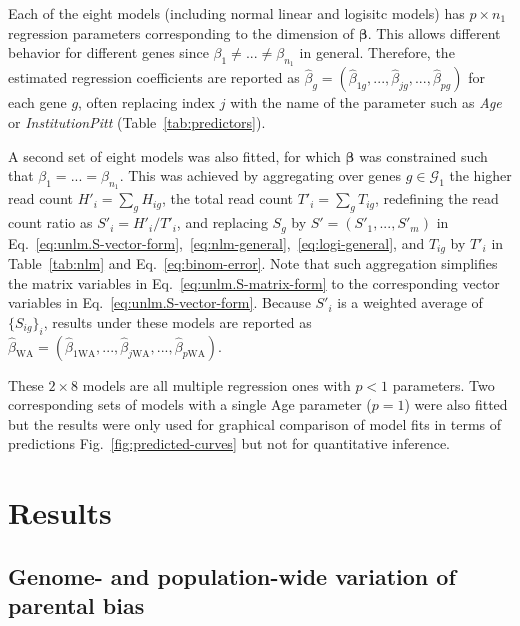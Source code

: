 \documentclass[letterpaper]{article}
\begin{document}
Each of the eight models (including normal linear and logisitc models) has \(p\times n_1\) regression parameters corresponding to the
dimension of \(\boldsymbol{\beta}\).  This allows different behavior for
different genes since \(\beta_1\neq ...\neq\beta_{n_1}\) in general.
Therefore, the estimated regression coefficients are reported as \(\hat{\beta}_g =
(\hat{\beta}_{1g},...,\hat{\beta}_{jg},...,\hat{\beta}_{pg})\) for each gene \(g\), often
replacing index \(j\) with the name of the parameter such as \emph{Age} or
\emph{InstitutionPitt} (Table~\ref{tab:predictors}).

A second set of eight models was also
fitted, for which \(\boldsymbol{\beta}\) was constrained such that \(\beta_1 =
... = \beta_{n_1}\).  This was achieved by aggregating over genes
\(g\in\mathcal{G}_1\) the higher read count \(H'_i = \sum_g H_{ig}\), the
total read count \(T'_i = \sum_g T_{ig}\), redefining the read count ratio
as \(S'_i = H'_i / T'_i\), and replacing \(S_g\) by \(S'=(S'_1,...,S'_m)\) in
Eq.~\ref{eq:unlm.S-vector-form},~\ref{eq:nlm-general},~\ref{eq:logi-general}, and \(T_{ig}\) by \(T'_i\) in
Table~\ref{tab:nlm} and Eq.~\ref{eq:binom-error}.  Note that such aggregation
simplifies the matrix variables in Eq.~\ref{eq:unlm.S-matrix-form} to the
corresponding vector variables in Eq.~\ref{eq:unlm.S-vector-form}.  Because \(S'_i\) is a
weighted average of \(\{S_{ig}\}_i\), results under these models are reported
as \(\hat{\beta}_\mathrm{WA} =
(\hat{\beta}_{1\mathrm{WA}},...,\hat{\beta}_{j\mathrm{WA}},...,\hat{\beta}_{p\mathrm{WA}})\).

These \(2\times 8\) models are all multiple regression ones with \(p<1\)
parameters.  Two corresponding sets of models with a single Age parameter
(\(p=1\)) were also fitted but the results were only used for graphical
comparison of model fits in terms of predictions
Fig.~\ref{fig:predicted-curves} but not for quantitative inference.

\section{Results}

\subsection{Genome- and population-wide variation of parental bias}
\end{document}

